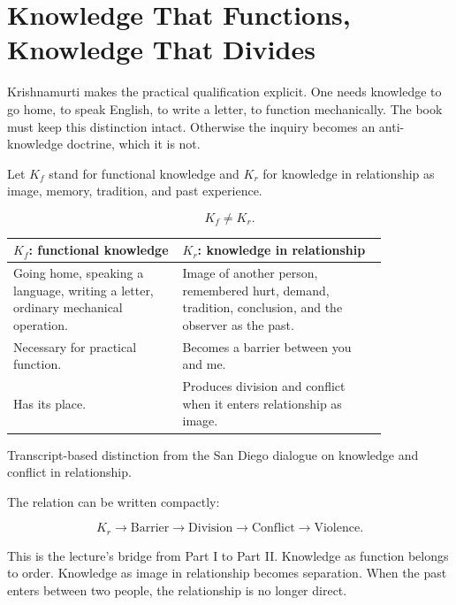 \documentclass[11pt,oneside]{book}
\begin{document}
\section{Knowledge That Functions, Knowledge That Divides}

Krishnamurti makes the practical qualification explicit. One needs knowledge to go home, to speak English, to write a letter, to function mechanically. The book must keep this distinction intact. Otherwise the inquiry becomes an anti-knowledge doctrine, which it is not.

Let \(K_f\) stand for functional knowledge and \(K_r\) for knowledge in relationship as image, memory, tradition, and past experience.

\begin{equation}
K_f \neq K_r.
\end{equation}

\begin{table}
\centering
\begin{tabular}{|p{0.38\linewidth}|p{0.46\linewidth}|}
\hline
\textbf{\(K_f\): functional knowledge} & \textbf{\(K_r\): knowledge in relationship}\\
\hline
Going home, speaking a language, writing a letter, ordinary mechanical operation. & Image of another person, remembered hurt, demand, tradition, conclusion, and the observer as the past.\\
\hline
Necessary for practical function. & Becomes a barrier between you and me.\\
\hline
Has its place. & Produces division and conflict when it enters relationship as image.\\
\hline
\end{tabular}

Transcript-based distinction from the San Diego dialogue on knowledge and conflict in relationship.
\end{table}

The relation can be written compactly:

\begin{equation}
K_r
\longrightarrow
\mathrm{Barrier}
\longrightarrow
\mathrm{Division}
\longrightarrow
\mathrm{Conflict}
\longrightarrow
\mathrm{Violence}.
\end{equation}

This is the lecture's bridge from Part I to Part II. Knowledge as function belongs to order. Knowledge as image in relationship becomes separation. When the past enters between two people, the relationship is no longer direct.
\end{document}
